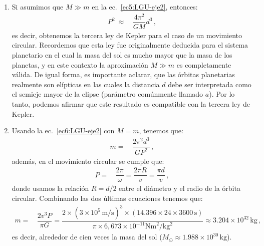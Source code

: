 \begin{enumerate}
\begin{enumerate}
\item Si asumimos que $M\gg m$ en la ec.~\eqref{ec5:LGU-eje2}, entonces:
%
\begin{align}
\label{ec7:LGU-eje2}
P^2~\approx\,&\dfrac{4\pi^2}{GM}d^3\,,
\end{align}
es decir, obtenemos la tercera ley de Kepler para el caso de un movimiento circular. Recordemos que esta ley fue originalmente deducida para el sistema planetario en el cual la masa del sol es mucho mayor que la masa de los planetas, y en este contexto la aproximación $M\gg m$ es completamente válida. De igual forma, es importante aclarar, que las órbitas planetarias realmente son elípticas en las cuales la distancia $d$ debe ser interpretada como el semieje mayor de la elipse (parámetro comúnmente llamado $a$). Por lo tanto, podemos afirmar que este resultado es compatible con la tercera ley de Kepler.

\item Usando la ec.~\eqref{ec6:LGU-eje2} con $M=m$, tenemos que:
%
\begin{align}
\label{ec8:LGU-eje2}
m=\,&\dfrac{2\pi^2 d^3}{G P^2}\,,
\end{align}
%
además, en el movimiento circular se cumple que:
\begin{align}
\label{ec9:LGU-eje2}
P=\,&\dfrac{2\pi}{\omega}=\dfrac{2\pi R }{v}=\dfrac{\pi d}{v}\,,
\end{align}
donde usamos la relación $R=d/2$ entre el diámetro y el radio de la órbita circular.
Combinando las dos últimas ecuaciones tenemos que:
\begin{align}
m=\,&\dfrac{2v^3P}{\pi G} = \dfrac{2\times(3\times 10^5\, \text{m/s})^3\times ( 14.396 \times 24\times 3600\, \text{s})}{\pi\times 6,673\times 10^{-11} \text{Nm}^2/\text{kg}^2}
\approx 3.204\times 10 ^{32}\, \text{kg}\,,
\end{align}
%
es decir, alrededor de cien veces la masa del sol ($M_{\odot}\approx 1.988 \times 10^{30}\,\text{kg}$).
\end{enumerate} 






\end{enumerate}
